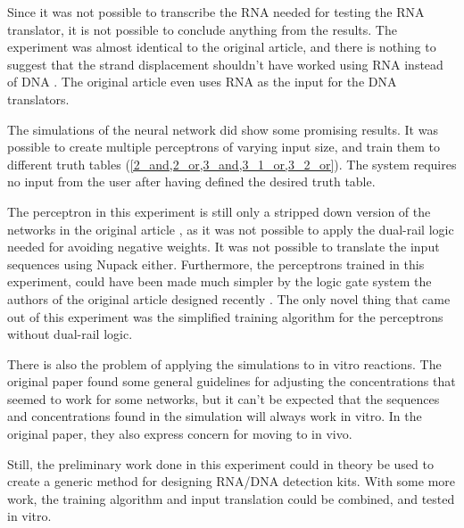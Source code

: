 
Since it was not possible to transcribe the RNA needed for testing the RNA translator, it is not possible to conclude anything from the results. The experiment was almost identical to the original article, and there is nothing to suggest that the strand displacement shouldn't have worked using RNA instead of DNA \cite{Picuri2009}. The original article even uses RNA as the input for the DNA translators.

The simulations of the neural network did show some promising results. It was possible to create multiple perceptrons of varying input size, and train them to different truth tables (\cref{2_and,2_or,3_and,3_1_or,3_2_or}). The system requires no input from the user after having defined the desired truth table.

The perceptron in this experiment is still only a stripped down version of the networks in the original article \cite{Qian2011}, as it was not possible to apply the dual-rail logic needed for avoiding negative weights. It was not possible to translate the input sequences using Nupack either. Furthermore, the perceptrons trained in this experiment, could have been made much simpler by the logic gate system the authors of the original article designed recently \cite{Thubagere2017}. The only novel thing that came out of this experiment was the simplified training algorithm for the perceptrons without dual-rail logic.

There is also the problem of applying the simulations to in vitro reactions. The original paper found some general guidelines for adjusting the concentrations that seemed to work for some networks, but it can't be expected that the sequences and concentrations found in the simulation will always work in vitro. In the original paper, they also express concern for moving to in vivo.

Still, the preliminary work done in this experiment could in theory be used to create a generic method for designing RNA/DNA detection kits. With some more work, the training algorithm and input translation could be combined, and tested in vitro.
